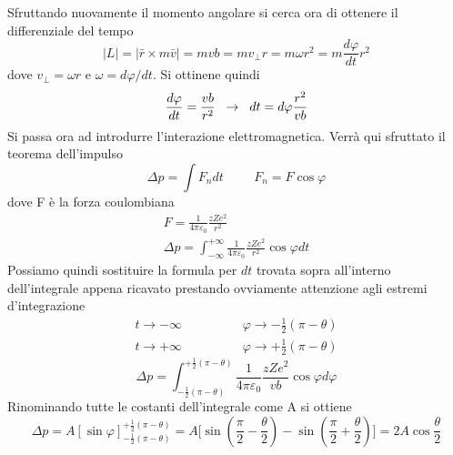 Sfruttando nuovamente il momento angolare si cerca ora di ottenere il differenziale del tempo
\begin{equation}
|L|=|\bar r \times m\bar v|=mvb=mv_\perp r=m\omega r^2=m\frac{d\varphi}{dt}r^2
\end{equation}
dove $v_\perp=\omega r$ e $\omega=d\varphi/dt$. 
Si ottinene quindi
\begin{equation}
\frac{d\varphi}{dt}=\frac{vb}{r^2}\hspace{0.2cm}\to\hspace{0.2cm} dt=d\varphi \frac{r^2}{vb}
\end{equation}
Si passa ora ad introdurre l'interazione elettromagnetica. 
Verrà qui sfruttato il teorema dell'impulso
\begin{equation}
\Delta p=\int F_n dt\hspace{1cm}F_n=F\cos\varphi
\end{equation}
dove F è la forza coulombiana
\begin{equation}
\begin{split}
F=\frac{1}{4\pi\varepsilon_0}\frac{zZe^2}{r^2}\\
\Delta p=\int_{-\infty}^{+\infty} \frac{1}{4\pi\varepsilon_0}\frac{zZe^2}{r^2}\cos\varphi dt
\end{split}
\end{equation}
Possiamo quindi sostituire la formula per $dt$ trovata sopra all'interno dell'integrale appena ricavato prestando ovviamente attenzione agli estremi d'integrazione 
\begin{equation}
\begin{split}
t\to -\infty\hspace{2cm}\varphi\to-\frac{1}{2}(\pi-\theta)\\
t\to +\infty\hspace{2cm}\varphi\to+\frac{1}{2}(\pi-\theta)
\end{split}
\end{equation}
\begin{equation}
\Delta p=\int _{-\frac{1}{2}(\pi-\theta)}^{+\frac{1}{2}(\pi-\theta)}\frac{1}{4\pi\varepsilon_0}\frac{zZe^2}{vb}\cos\varphi d\varphi
\end{equation}
Rinominando tutte le costanti dell'integrale come A si ottiene
\begin{equation}
\Delta p=A[\sin\varphi] _{-\frac{1}{2}(\pi-\theta)}^{+\frac{1}{2}(\pi-\theta)}=A\biggl[\sin\left(\frac{\pi}{2}-\frac{\theta}{2}\right)-\sin\left(\frac{\pi}{2}+\frac{\theta}{2}\right)\biggl]=2A\cos\frac{\theta}{2}
\end{equation}
